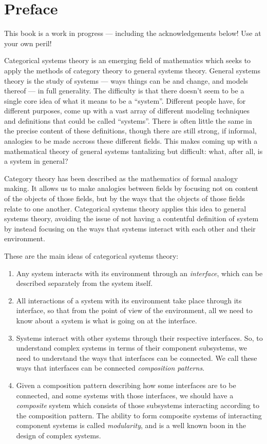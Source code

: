 \documentclass[DynamicalBook]{subfiles}
\begin{document}
%


\setcounter{chapter}{0}%


\chapter{Preface}\label{chapter.0}

This book is a work in progress --- including the acknowledgements below! Use at your own peril!

Categorical systems theory is an emerging field of mathematics which seeks to apply the methods of category theory to general systems theory. General systems theory is the study of systems --- ways things can be and change, and models thereof --- in full generality. The difficulty is that there doesn't seem to be a single core idea of what it means to be a ``system''. Different people have, for different purposes, come up with a vast array of different modeling techniques and definitions that could be called ``systems''. There is often little the same in the precise content of these definitions, though there are still strong, if informal, analogies to be made accross these different fields. This makes coming up with a mathematical theory of general systems tantalizing but difficult: what, after all, is a system in general?

Category theory has been described as the mathematics of formal analogy making. It allows us to make analogies between fields by focusing not on content of the objects of those fields, but by the ways that the objects of those fields relate to one another. Categorical systems theory applies this idea to general systems theory, avoiding the issue of not having a contentful definition of system by instead focusing on the ways that systems interact with each other and their environment.

These are the main ideas of categorical systems theory:
\begin{enumerate}
\item Any system interacts with its environment through an \emph{interface}, which can be described separately from the system itself.
\item All interactions of a system with its environment take place through its interface, so that from the point of view of the environment, all we need to know about a system is what is going on at the interface.
\item Systems interact with other systems through their respective interfaces. So, to understand complex systems in terms of their component subsystems, we need to understand the ways that interfaces can be connected. We call these ways that interfaces can be connected \emph{composition patterns}.
\item Given a composition pattern describing how some interfaces are to be connected, and some systems with those interfaces, we should have a \emph{composite} system which consists of those subsystems interacting according to the composition pattern. The ability to form composite systems of interacting component systems is called \emph{modularity}, and is a well known boon in the design of complex systems.
\end{enumerate}
\end{document}

